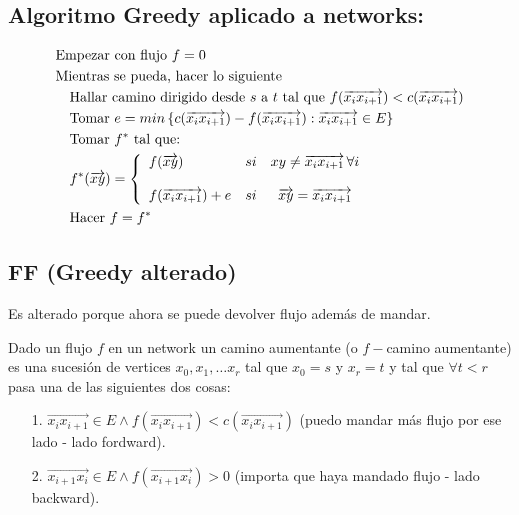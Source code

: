 \documentclass[12pt,a4paper]{article}
\begin{document}
\subsection{Algoritmo Greedy aplicado a networks:}
\begin{align*}
    &\text{Empezar con flujo $f = 0$}\\
    &\text{Mientras se pueda, hacer lo siguiente}\\
    &\,\,\,\,\,\,\text{Hallar camino dirigido desde $s$ a $t$ tal que $f(\overrightarrow{x_{i}x_{i+1}}) < c(\overrightarrow{x_{i}x_{i+1}})$}\\
    &\,\,\,\,\,\,\text{Tomar $e = min \left\lbrace c(\overrightarrow{x_{i}x_{i+1}}) - f(\overrightarrow{x_{i}x_{i+1}}) : \overrightarrow{x_{i}x_{i+1}} \in E \right\rbrace$}\\
    &\,\,\,\,\,\,\text{Tomar $f^{*}$ tal que:} \\
    &\,\,\,\,\,\,f^{*}(\overrightarrow{xy})= \left\{ \begin{array}{lcc}
            f(\overrightarrow{xy}) & si & xy \neq \overrightarrow{x_{i}x_{i+1}}\, \forall i \\
            \\ f(\overrightarrow{x_{i}x_{i+1}}) + e& si & \overrightarrow{xy} = \overrightarrow{x_{i}x_{i+1}}\\
            \end{array}
            \right.\\
    &\,\,\,\,\,\,\text{Hacer $f=f^{*}$}\\
\end{align*}

\subsection{FF (Greedy alterado)}
Es alterado porque ahora se puede devolver flujo además de mandar.
\medskip

\begin{definition} Dado un flujo $f$ en un network un camino aumentante (o $f-$camino aumentante)
    es una sucesión de vertices $x_{0},x_{1},\ldots x_{r}$ tal que $x_{0}=s$ y $x_{r}=t$ y tal que 
    $\forall t < r$ pasa una de las siguientes dos cosas:
    \begin{itemize}
        \item [1.] $\overrightarrow{x_{i}x_{i+1}} \in E \land f(\overrightarrow{x_{i}x_{i+1}}) < c(\overrightarrow{x_{i}x_{i+1}})$
            (puedo mandar más flujo por ese lado - lado fordward).
        \item [2.] $\overrightarrow{x_{i+1}x_{i}} \in E \land f(\overrightarrow{x_{i+1}x_{i}}) > 0$ 
            (importa que haya mandado flujo - lado backward).
    \end{itemize}
\end{definition}
\end{document}

